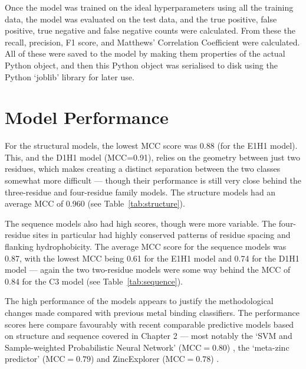 Once the model was trained on the ideal hyperparameters using all the training data, the model was evaluated on the test data, and the true positive, false positive, true negative and false negative counts were calculated. From these the recall, precision, F1 score, and Matthews' Correlation Coefficient were calculated. All of these were saved to the model by making them properties of the actual Python object, and then this Python object was serialised to disk using the Python `joblib' library for later use.

\section{Model Performance}

For the structural models, the lowest MCC score was 0.88 (for the E1H1 model). This, and the D1H1 model (MCC=0.91), relies on the geometry between just two residues, which makes creating a distinct separation between the two classes somewhat more difficult --- though their performance is still very close behind the three-residue and four-residue family models. The structure models had an average MCC of 0.960 (see Table~\ref{tab:structure}).

The sequence models also had high scores, though were more variable. The four-residue sites in particular had highly conserved patterns of residue spacing and flanking hydrophobicity. The average MCC score for the sequence models was 0.87, with the lowest MCC being 0.61 for the E1H1 model and 0.74 for the D1H1 model --- again the two two-residue models were some way behind the MCC of 0.84 for the C3 model (see Table~\ref{tab:sequence}).

The high performance of the models appears to justify the methodological changes made compared with previous metal binding classifiers. The performance scores here compare favourably with recent comparable predictive models based on structure and sequence covered in Chapter 2 --- most notably the `SVM and Sample-weighted Probabilistic Neural Network' (MCC$=0.80$) \cite{li2019}, the `meta-zinc predictor' (MCC$=0.79$) \cite{li2017} and ZincExplorer (MCC$=0.78$) \cite{chen2013}.

